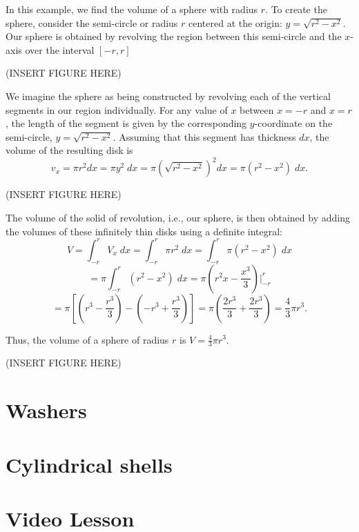 \documentclass{ximera}
\begin{document}
\begin{example}
In this example, we find the volume of a sphere with radius $r$.
To create the sphere, consider the semi-circle or radius $r$ centered at the origin: $y = \sqrt{r^2 - x^2}$.
Our sphere is obtained by revolving the region between this semi-circle and the $x$-axis over the interval $[-r,r]$

(INSERT FIGURE HERE)

We imagine the sphere as being constructed by revolving each of the vertical segments in our region individually.
For any value of $x$ between $x = -r$ and $x = r$, the length of the segment is given by the corresponding $y$-coordinate
on the semi-circle, $y = \sqrt{r^2 - x^2}$. Assuming that this segment has thickness $dx$, the volume of the resulting disk is 
\[
v_x = \pi r^2 dx = \pi y^2 \; dx = \pi \left(\sqrt{r^2 - x^2}\right)^2 dx = \pi (r^2 - x^2)\; dx.
\]

(INSERT FIGURE HERE)

The volume of the solid of revolution, i.e., our sphere, is then obtained by adding the volumes of these infinitely thin disks using a definite integral:
\[
V = \int_{-r}^r V_x \; dx = \int_{-r}^r \pi r^2 \; dx = \int_{-r}^r \pi (r^2 - x^2) \; dx 
\]
\[
= \pi \int_{-r}^r  (r^2 - x^2) \; dx = \pi  \left(r^2 x - \frac{x^3}{3}\right)\bigg|_{-r}^r 
\]
\[
= \pi \left[ \left(r^3 - \frac{r^3}{3}\right) - \left(-r^3 + \frac{r^3}{3}\right)\right] = \pi \left(\frac{2r^3}{3} + \frac{2r^3}{3}\right) = \frac43 \pi r^3.
\]

Thus, the volume of a sphere of radius $r$ is $V = \frac43 \pi r^3$.

(INSERT FIGURE HERE)

\end{example}


\section{Washers}

\section{Cylindrical shells}






































\section{Video Lesson}




\begin{center}
\begin{foldable}
\end{foldable}
\end{center}
\end{document}
